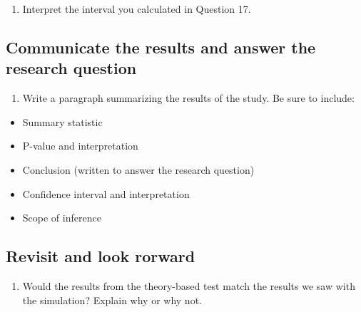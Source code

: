 \documentclass[
]{report}
\providecommand{\tightlist}{%
  \setlength{\itemsep}{0pt}\setlength{\parskip}{0pt}}
\begin{document}
\begin{enumerate}
\def\labelenumi{\arabic{enumi}.}
\setcounter{enumi}{17}
\tightlist
\item
  Interpret the interval you calculated in Question 17.
\end{enumerate}

\vspace{1in}

\hypertarget{communicate-the-results-and-answer-the-research-question}{%
\subsection{Communicate the results and answer the research question}\label{communicate-the-results-and-answer-the-research-question}}

\begin{enumerate}
\def\labelenumi{\arabic{enumi}.}
\setcounter{enumi}{18}
\tightlist
\item
  Write a paragraph summarizing the results of the study. Be sure to include:
\end{enumerate}

\begin{itemize}
\item
  Summary statistic
\item
  P-value and interpretation
\item
  Conclusion (written to answer the research question)
\item
  Confidence interval and interpretation
\item
  Scope of inference
\end{itemize}

\vspace{3in}

\hypertarget{revisit-and-look-rorward}{%
\subsection{Revisit and look rorward}\label{revisit-and-look-rorward}}

\begin{enumerate}
\def\labelenumi{\arabic{enumi}.}
\setcounter{enumi}{19}
\tightlist
\item
  Would the results from the theory-based test match the results we saw with the simulation? Explain why or why not.
\end{enumerate}

\vspace{1in}
\end{document}
